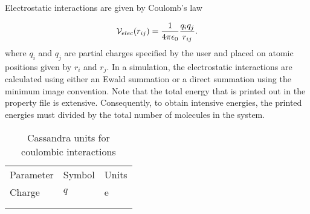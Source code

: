Electrostatic interactions are given by  Coulomb's law

\begin{equation}
{\cal V}_{elec} (r_{ij}) = \frac{1}{4\pi\epsilon_0} \frac {q_i q_j} {r_{ij}}.
\label{Eq:Coulomb}
\end{equation}
where $q_i$ and $q_j$ are partial charges specified by the user and
placed on atomic positions given by $r_i$ and $r_j$. In a simulation,
the electrostatic interactions are calculated using either an Ewald
summation or a direct summation using the minimum image convention. Note that 
the total energy that is printed out in the property file is extensive. 
Consequently, to obtain intensive energies, the printed energies must divided by 
the total number of molecules in the system. 

\begin{center}
\begin{table}[h]
	\begin{center}
	\caption{Cassandra units for coulombic interactions}
	\begin{tabular} {l l l} \\ \hline \hline
	 Parameter & Symbol &  Units \\
	Charge &	 $q$ & e \\ \\ \hline \\
	\end{tabular}
	\end{center}
	\label{Tab:LJ_Units}
\end{table}
\end{center}


